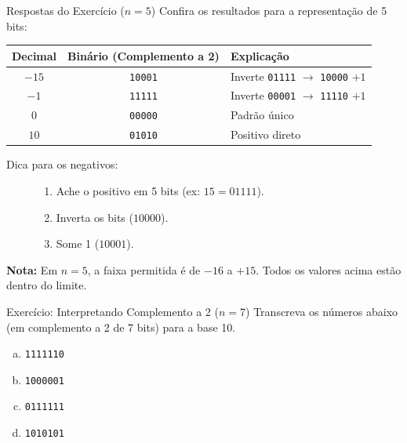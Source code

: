\begin{frame}{Respostas do Exercício ($n=5$)}
    Confira os resultados para a representação de 5 bits:

    \begin{table}[]
        \centering
        \begin{tabular}{|c|c|l|}
            \hline
            \textbf{Decimal} & \textbf{Binário (Complemento a 2)} & \textbf{Explicação}                                       \\ \hline
            $-15$            & \texttt{10001}                     & Inverte \texttt{01111} $\rightarrow$ \texttt{10000} $+ 1$ \\ \hline
            $-1$             & \texttt{11111}                     & Inverte \texttt{00001} $\rightarrow$ \texttt{11110} $+ 1$ \\ \hline
            $0$              & \texttt{00000}                     & Padrão único                                              \\ \hline
            $10$             & \texttt{01010}                     & Positivo direto                                           \\ \hline
        \end{tabular}
    \end{table}

    \vspace{0.4cm}
    \begin{description}
        \item[Dica para os negativos:]
              \begin{enumerate}
                  \item Ache o positivo em 5 bits (ex: $15 = 01111$).
                  \item Inverta os bits ($10000$).
                  \item Some 1 ($10001$).
              \end{enumerate}
    \end{description}

    \vspace{0.3cm}
    \textbf{Nota:} Em $n=5$, a faixa permitida é de $-16$ a $+15$. Todos os valores acima estão dentro do limite.
\end{frame}

\begin{frame}{Exercício: Interpretando Complemento a 2 ($n=7$)}
    Transcreva os números abaixo (em complemento a 2 de 7 bits) para a base 10.


    \begin{enumerate}[a)]
        \item \texttt{1111110}
        \item \texttt{1000001}
        \item \texttt{0111111}
        \item \texttt{1010101}
    \end{enumerate}


\end{frame}

